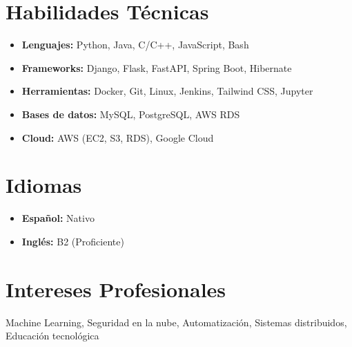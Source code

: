 \documentclass[a4paper,10pt]{article}
\begin{document}
	\section*{Habilidades Técnicas}
	\begin{itemize}[leftmargin=*]
		\item \textbf{Lenguajes:} Python, Java, C/C++, JavaScript, Bash
		\item \textbf{Frameworks:} Django, Flask, FastAPI, Spring Boot, Hibernate
		\item \textbf{Herramientas:} Docker, Git, Linux, Jenkins, Tailwind CSS, Jupyter
		\item \textbf{Bases de datos:} MySQL, PostgreSQL, AWS RDS
		\item \textbf{Cloud:} AWS (EC2, S3, RDS), Google Cloud
	\end{itemize}
	
	\section*{Idiomas}
	\begin{itemize}[leftmargin=*]
		\item \textbf{Español:} Nativo
		\item \textbf{Inglés:} B2 (Proficiente)
	\end{itemize}
	
	\section*{Intereses Profesionales}
	Machine Learning, Seguridad en la nube, Automatización, Sistemas distribuidos, Educación tecnológica
	
\end{document}
